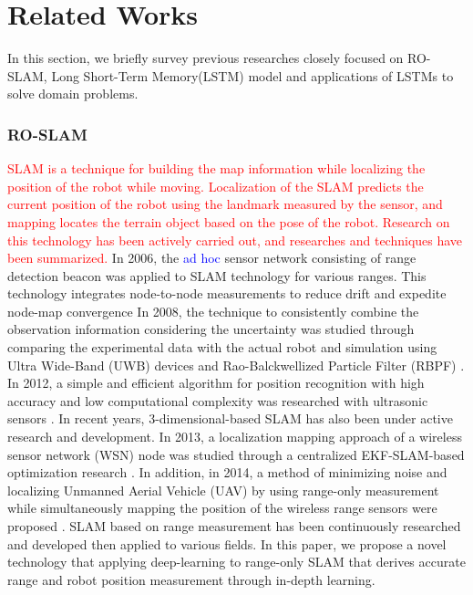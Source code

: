 \documentclass[letterpaper, 10 pt, conference]{ieeeconf}  %
\begin{document}
\section{Related Works}

In this section, we briefly survey previous researches closely focused on 
RO-SLAM, Long Short-Term Memory(LSTM) model and applications of LSTMs to solve domain problems.

\subsubsection{RO-SLAM}


\textcolor{red}{SLAM is a technique for building the map information while localizing the position of the robot while moving. Localization of the SLAM predicts the current position of the robot using the landmark measured by the sensor, and mapping locates the terrain object based on the pose of the robot. Research on this technology has been actively carried out, and researches and techniques have been summarized.} In 2006, the \textcolor{blue}{ad hoc} sensor network consisting of range detection beacon was applied to SLAM technology for various ranges. This technology integrates node-to-node measurements to reduce drift and expedite node-map convergence \cite{djugash2006range} In 2008, the technique to consistently combine the observation information considering the uncertainty was studied through comparing the experimental data with the actual robot and simulation using Ultra Wide-Band (UWB) devices and Rao-Balckwellized Particle Filter (RBPF) \cite{blanco2008pure}.  In 2012, a simple and efficient algorithm for position recognition with high accuracy and low computational complexity was researched with ultrasonic sensors \cite{yang2012efficient}. In recent years, 3-dimensional-based SLAM has also been under active research and development. In 2013, a localization mapping approach of a wireless sensor network (WSN) node was studied through a centralized EKF-SLAM-based optimization research \cite{fabresse2013undelayed}. In addition, in 2014, a method of minimizing noise and localizing Unmanned Aerial Vehicle (UAV) by using  range-only measurement while simultaneously mapping the position of the wireless range sensors were proposed \cite{fabresse2014robust}. 
SLAM based on range measurement has been continuously researched and developed then applied to various fields. In this paper, we propose a novel technology that applying deep-learning to range-only SLAM that derives accurate range and robot position measurement through in-depth learning. 
\end{document}
